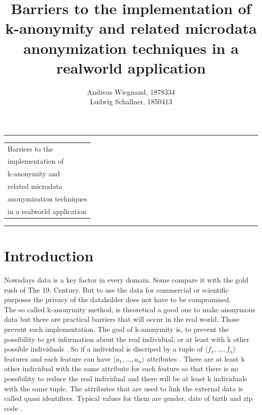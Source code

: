 \documentclass{llncs}
\begin{document}
\thispagestyle{empty}
\rule{\textwidth}{1pt}
\vspace{2pt}
\begin{flushright}
\Huge
\begin{tabular}{@{}l}
Barriers to the\\
implementation of\\
k-anonymity and\\
related microdata\\
anonymization techniques\\
in a realworld application\\[6pt]

\end{tabular}
\end{flushright}
\rule{\textwidth}{1pt}
\vfill
\title{Barriers to the implementation of k-anonymity and related microdata anonymization techniques in a realworld application}
\author{Andreas Wiegnand, 1878334\\
	Ludwig Schallner, 1850413}
\institute{}
\maketitle
%
\newpage
\section{Introduction}
%
Nowadays data is a key factor in every domain. Some compare it with the gold rush of
The 19. Century\cite{datarevo}. But to use the data for commercial or scientific purposes the privacy of the dataholder does not have to be compromised.\\

The so called k-anonymity method, is theoretical a good one to make anonymous data but there are practical barriers that will occur in the real world. Those prevent such implementation. The goal of k-anonymity is, to prevent the possibility to get information about the real individual, or at least with k other possible individuals \cite{sweeney2002k}. So if a individual is discriped by a tuple of \ensuremath{\langle f_1, ... ,f_n \rangle} features and each feature can have \ensuremath{\langle a_1,...,a_n \rangle} attributes \cite{sweeney2002k}. There are at least k other individual with the same attribute for each feature so that there is no possibility to reduce the real individual and there will be at least k individuals with the same tuple\cite{sweeney2002k}. The attributes that are used to link the external data is called quasi identifiers. Typical values for them are gender, date of birth and zip code \cite{ldiversity}. \\
\end{document}
